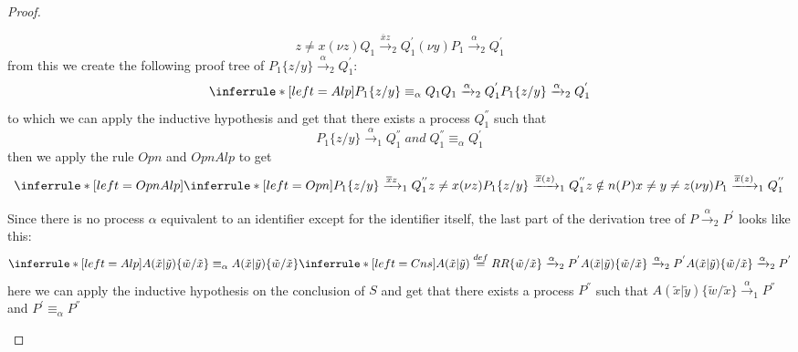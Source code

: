 \begin{theorem}
\begin{proof}
\begin{description}
\begin{description}
\begin{itemize}
\[{{			  z\neq x
		      }{
			(\nu z)Q_{1}\xrightarrow{\overline{x}z}_{2}Q_{1}^{'}
		      }
		  }{
		    (\nu y)P_{1}\xrightarrow{\alpha}_{2}Q_{1}^{'}
		  }
		\]
		from this we create the following proof tree of $P_{1}\{z/y\}\xrightarrow{\alpha}_{2}Q_{1}^{'}$:
		\[
		  \inferrule* [left=Alp]{
		      P_{1}\{z/y\}\equiv_{\alpha}Q_{1}
		    \\
		      Q_{1}\xrightarrow{\alpha}_{2}Q_{1}^{'}
		  }{
		    P_{1}\{z/y\}\xrightarrow{\alpha}_{2}Q_{1}^{'}
		  }		
		\]
		to which we can apply the inductive hypothesis and get that there exists a process $Q_{1}^{''}$ such that
		\[
		  P_{1}\{z/y\}\xrightarrow{\alpha}_{1}Q_{1}^{''}\;and\; Q_{1}^{''}\equiv_{\alpha}Q_{1}^{'}
		\]
		then we apply the rule $Opn$ and $OpnAlp$ to get
		\[
		  \inferrule* [left=OpnAlp]{
		      \inferrule* [left=Opn]{
			  P_{1}\{z/y\} \xrightarrow{\overline{x}z}_{1}Q_{1}^{''}
			\\
			  z\neq x
		      }{
			(\nu z)P_{1}\{z/y\} \xrightarrow{\overline{x}(z)}_{1}Q_{1}^{''}
		      }
		    \\
		      z\notin n(P)
		    \\
		      x\neq y\neq z
		  }{
		    (\nu y)P_{1} \xrightarrow{\overline{x}(z)}_{1}Q_{1}^{''}
		  }
		\]
	    \end{itemize}
	  \item[Cns]
	    Since there is no process $\alpha$ equivalent to an identifier except for the identifier itself, the last part of the derivation tree of $P\xrightarrow{\alpha}_{2}P^{'}$ looks like this:
 		\[
 		  \inferrule* [left=Alp]{
 		      A(\tilde{x}|\tilde{y})\{\tilde{w}/\tilde{x}\}\equiv_{\alpha}A(\tilde{x}|\tilde{y})\{\tilde{w}/\tilde{x}\}
 		    \\
 		      \inferrule* [left=Cns]{
 			  A(\tilde{x}|\tilde{y})\stackrel{def}{=}R
 			\\
 			  R\{\tilde{w}/\tilde{x}\}\xrightarrow{\alpha}_{2}P^{'}
 		      }{
 			A(\tilde{x}|\tilde{y})\{\tilde{w}/\tilde{x}\}\xrightarrow{\alpha}_{2}P^{'}
 		      }
 		  }{
 		    A(\tilde{x}|\tilde{y})\{\tilde{w}/\tilde{x}\}\xrightarrow{\alpha}_{2}P^{'}
 		  }
 		\]
	    here we can apply the inductive hypothesis on the conclusion of $S$ and get that there exists a process $P^{''}$ such that $A(\tilde{x}|\tilde{y})\{\tilde{w}/\tilde{x}\}\xrightarrow{\alpha}_{1}P^{''}$ and $P^{'}\equiv_{\alpha}P^{''}$

\end{description}
\end{description}
\end{proof}
\end{theorem}
